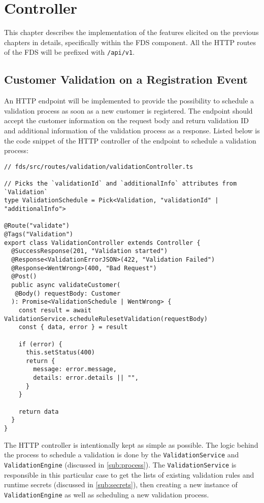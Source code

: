 \section{Controller}

  This chapter describes the implementation of the features elicited on the previous chapters in details, specifically within the FDS component. All the HTTP routes of the FDS will be prefixed with \verb;/api/v1;.

  \subsection{Customer Validation on a Registration Event}

    An HTTP endpoint will be implemented to provide the possibility to schedule a validation process as soon as a new customer is registered. The endpoint should accept the customer information on the request body and return validation ID and additional information of the validation process as a response. Listed below is the code snippet of the HTTP controller of the endpoint to schedule a validation process:

    \begin{lstlisting}[style=es6, caption={HTTP controller of an endpoint to schedule a validation process (TypeScript)}]
// fds/src/routes/validation/validationController.ts

// Picks the `validationId` and `additionalInfo` attributes from `Validation` 
type ValidationSchedule = Pick<Validation, "validationId" | "additionalInfo"> 
     
@Route("validate")
@Tags("Validation")
export class ValidationController extends Controller {
  @SuccessResponse(201, "Validation started")
  @Response<ValidationErrorJSON>(422, "Validation Failed")
  @Response<WentWrong>(400, "Bad Request")
  @Post()
  public async validateCustomer(
   @Body() requestBody: Customer
  ): Promise<ValidationSchedule | WentWrong> {
    const result = await ValidationService.scheduleRulesetValidation(requestBody)
    const { data, error } = result

    if (error) {
      this.setStatus(400)
      return {
        message: error.message,
        details: error.details || "",
      }
    }

    return data
  }
} 
    \end{lstlisting}
    
    The HTTP controller is intentionally kept as simple as possible. The logic behind the process to schedule a validation is done by the \verb;ValidationService; and \verb;ValidationEngine; (discussed in \autoref{sub:process}). The \verb;ValidationService; is responsible in this particular case to get the lists of existing validation rules and runtime secrets (discussed in \autoref{sub:secrets}), then creating a new instance of \verb;ValidationEngine; as well as scheduling a new validation process. 

